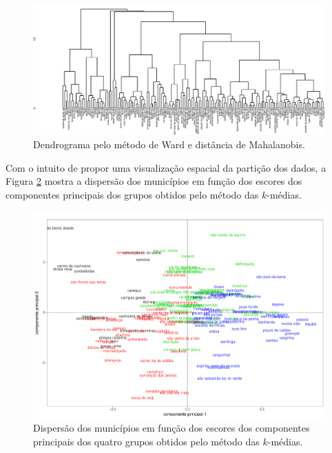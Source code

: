 \documentclass[10pt,twoside]{article}
\begin{document}
\begin{figure}[htp!]
\begin{center}  
\includegraphics[scale=0.42]{ward_dend_crop}
\end{center}
\caption{Dendrograma pelo método de Ward e distância de Mahalanobis.} \label{wr_maha}
\end{figure}
\FloatBarrier


Com o intuito de propor uma visualização espacial da partição dos dados, a Figura \ref{cps} mostra a dispersão dos municípios em função dos escores dos componentes principais dos grupos obtidos pelo método das $k$-médias. 
 

\begin{figure}[htp!]
\begin{center}
\includegraphics[scale=0.24]{cps_kmeans}
\end{center}
\caption{Dispersão dos municípios em função dos escores dos componentes principais dos quatro grupos obtidos pelo método das $k$-médias.} \label{cps}
\end{figure}
\FloatBarrier
\end{document}
